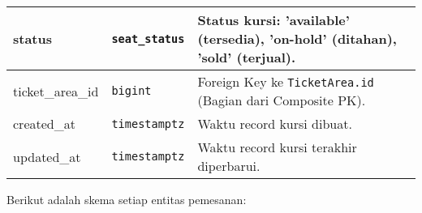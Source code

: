 \begin{longtable}{|l|p{}|p{}|}
	\hline
	status 				& \texttt{seat\_status} 	& Status kursi: 'available' (tersedia), 'on-hold' (ditahan), 'sold' (terjual). 														\\
	\hline
	ticket\_area\_id 	& \texttt{bigint} 		& Foreign Key ke \texttt{TicketArea.id} (Bagian dari Composite PK). 																		\\
	\hline
	created\_at 		& \texttt{timestamptz} 	& Waktu record kursi dibuat. 																														\\
	\hline
	updated\_at 		& \texttt{timestamptz} 	& Waktu record kursi terakhir diperbarui. 																										\\
\end{longtable}
\endgroup

Berikut adalah skema setiap entitas pemesanan:

\begingroup
\footnotesize
